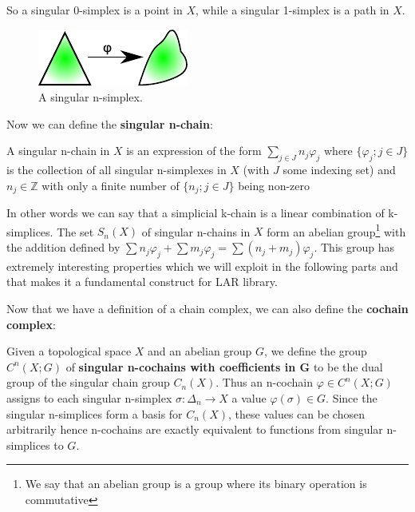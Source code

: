 So a singular 0-simplex is a point in $X$, while a singular 1-simplex is a path in $X$.

\begin{figure}[htb] %
   \centering
   \includegraphics[width=0.35\linewidth]{images/singularsimplex.pdf}
   \caption[A singular n-simplex]{A singular n-simplex.}
   \label{fig:singularSimplex}
\end{figure}


Now we can define the \textbf{singular n-chain}:

\begin{definition}
 A singular n-chain in $X$ is an expression of the form $\displaystyle\sum_{j  \in J} n_{j} \varphi_{j}$ where $\{ \varphi_{j}; j \in J \}$ is the collection of all singular n-simplexes in $X$ (with $J$ some indexing set) and $n_{j} \in \mathbb{Z}$ with only a finite number of $\{ n_{j}; j \in J \}$ being non-zero
\end{definition}

In other words we can say that a simplicial k-chain is a linear combination of k-simplices.
The set $S_{n}(X)$ of singular n-chains in $X$ form an abelian group\footnote{We say that an abelian group is a group where its binary operation is commutative} with the addition defined by $\sum n_{j} \varphi_{j} + \sum m_{j} \varphi_{j} = \sum(n_{j} + m_{j}) \varphi_{j}$. This group has extremely interesting properties which we will exploit in the following parts and that makes it a fundamental construct for LAR library.

Now that we have a definition of a chain complex, we can also define the \textbf{cochain complex}:

\begin{definition}
Given a topological space $X$ and an abelian group $G$, we define the group $C^{n}(X;G)$ of \textbf{singular n-cochains with coefficients in G} to be the dual group of the singular chain group $C_{n}(X)$. Thus an n-cochain $\varphi \in C^{n}(X;G)$ assigns to each singular n-simplex $\sigma \colon \Delta_{n} \rightarrow X$ a value $\varphi(\sigma) \in G$. Since the singular n-simplices form a basis for $C_{n}(X)$, these values can be chosen arbitrarily hence n-cochains are exactly equivalent to functions from singular n-simplices to $G$.
\end{definition}

